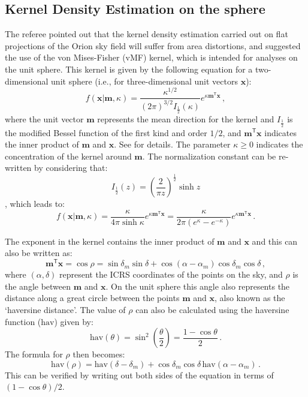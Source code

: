\documentclass[onecolumn]{aa} %
\begin{document}
\begin{appendix}
\section{Kernel Density Estimation on the sphere}
The referee pointed out that the kernel density estimation carried out on flat projections of the
Orion sky field will suffer from area distortions, and suggested the use of the von Mises-Fisher
(vMF) kernel, which is intended for analyses on the unit sphere. This kernel is given by the
following equation for a two-dimensional unit sphere (i.e., for three-dimensional unit vectors
$\mathbf{x}$):
\begin{equation}
  f(\mathbf{x}|\mathbf{m}, \kappa) = \frac{\kappa^{1/2}}{(2\pi)^{3/2} I_\frac{1}{2}(\kappa)}
  e^{\kappa\mathbf{m}^\mathsf{T}\mathbf{x}}\,,
  \label{eq:vMFkernel3D}
\end{equation}
where the unit vector $\mathbf{m}$ represents the mean direction for the kernel and
$I_\frac{1}{2}$ is the modified Bessel function of the first kind and order $1/2$, and
$\mathbf{m}^\mathsf{T}\mathbf{x}$ indicates the inner product of $\mathbf{m}$ and $\mathbf{x}$. See
\cite{vmFPaper} for details. The parameter $\kappa\geq0$ indicates the concentration of the
kernel around $\mathbf{m}$. The normalization constant can be re-written by considering that:
\begin{equation}
  I_{\frac{1}{2}}\left(z\right)=\left(\frac{2}{\pi z}\right)^{\frac{1}{2}}\sinh z
\end{equation}
\citep[eq.\ 10.39.1 in][]{NIST}, which leads to:
\begin{equation}
  f(\mathbf{x}|\mathbf{m}, \kappa) = \frac{\kappa}{4\pi\sinh\kappa}
  e^{\kappa\mathbf{m}^\mathsf{T}\mathbf{x}} = \frac{\kappa}{2\pi(e^\kappa-e^{-\kappa})}
  e^{\kappa\mathbf{m}^\mathsf{T}\mathbf{x}}\,.
\end{equation}

The exponent in the kernel contains the inner product of $\mathbf{m}$ and $\mathbf{x}$ and this can
also be written as:
\begin{equation}
  \mathbf{m}^\mathsf{T}\mathbf{x} = \cos\rho = \sin\delta_{m}\sin\delta + \cos(\alpha-\alpha_{m})
  \cos\delta_{m}\cos\delta\,,
\end{equation}
where $(\alpha, \delta)$ represent the ICRS coordinates of the points on the sky, and $\rho$ is the
angle between $\mathbf{m}$ and $\mathbf{x}$. On the unit sphere this angle also represents the
distance along a great circle between the points $\mathbf{m}$ and $\mathbf{x}$, also known as the
`haversine distance'. The value of $\rho$ can also be calculated using the haversine function
($\mathrm{hav}$) given by:
\begin{equation}
  \mathrm{hav}(\theta) = \sin^2\left(\frac{\theta}{2}\right) = \frac{1-\cos\theta}{2}\,.
\end{equation}
The formula for $\rho$ then becomes:
\begin{equation}
  \mathrm{hav}(\rho) = \mathrm{hav}(\delta-\delta_m) + \cos\delta_m\cos\delta \,\mathrm{hav}(\alpha-\alpha_m)\,.
\end{equation}
This can be verified by writing out both sides of the equation in terms of $(1-\cos\theta)/2$.


\end{appendix}
\end{document}
